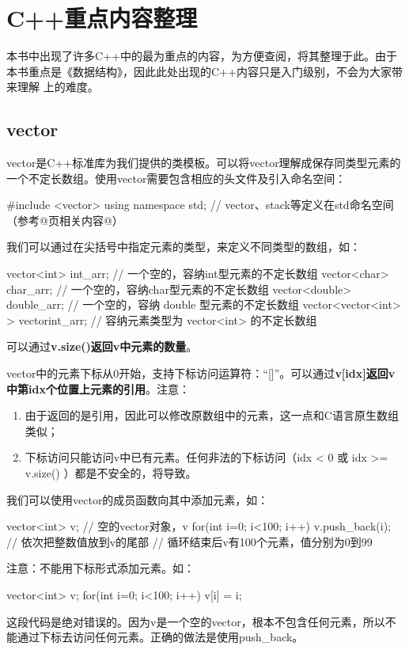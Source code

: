 \chapter*{C++重点内容整理}
\label{ch:C++重点内容整理}

本书中出现了许多C++中的最为重点的内容，为方便查阅，将其整理于此。由于本书重点是《数据结构》，因此此处出现的C++内容只是入门级别，不会为大家带来理解
上的难度。
\section*{vector}

vector是C++标准库为我们提供的类模板。可以将vector理解成保存同类型元素的一个不定长数组。使用vector需要包含相应的头文件及引入命名空间：
\begin{cppcode}
    #include <vector>
    using namespace std;    // vector、stack等定义在std命名空间（参考@\pageref{subsec:命名空间}页相关内容@）
\end{cppcode}


我们可以通过在尖括号中指定元素的类型，来定义不同类型的数组，如：
\begin{cppcode}
    vector<int> int_arr;        // 一个空的，容纳int型元素的不定长数组
    vector<char> char_arr;      // 一个空的，容纳char型元素的不定长数组
    vector<double> double_arr;  // 一个空的，容纳 double 型元素的不定长数组
    vector<vector<int> > vectorint_arr; // 容纳元素类型为 vector<int> 的不定长数组
\end{cppcode}

可以通过\textbf{v.size()返回v中元素的数量}。

vector中的元素下标从0开始，支持下标访问运算符：“[]”。可以通过\textbf{v[idx]返回v中第idx个位置上元素的引用}。注意：
\begin{enumerate}
    \item 由于返回的是引用，因此可以修改原数组中的元素，这一点和C语言原生数组类似；
    \item 下标访问只能访问v中已有元素。任何非法的下标访问（idx < 0 或 idx >= v.size() ）都是不安全的，将导致。
\end{enumerate}

我们可以使用vector的成员函数向其中添加元素，如：
\begin{cppcode}
    vector<int> v;  // 空的vector对象，v
    for(int i=0; i<100; i++) {
        v.push_back(i); // 依次把整数值放到v的尾部
    }
    // 循环结束后v有100个元素，值分别为0到99
\end{cppcode}
注意：不能用下标形式添加元素。如：
\begin{cppcode}
    vector<int> v;
    for(int i=0; i<100; i++) {
        v[i] = i;
    }
\end{cppcode}
这段代码是绝对错误的。因为v是一个空的vector，根本不包含任何元素，所以不能通过下标去访问任何元素。正确的做法是使用push\_back。



